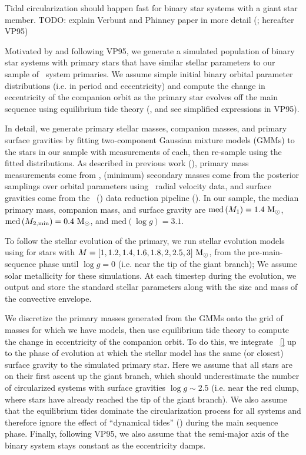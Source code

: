 \documentclass[modern, letterpaper]{aastex62}
\newcommand{\apogee}{\project{\acronym{APOGEE}}}
\newcommand{\DR}{\acronym{DR14}}
\newcommand{\logg}{\ensuremath{\log g}}
\newcommand{\med}[1]{\ensuremath{\textrm{med}\left(#1\right)}}
\begin{document}
Tidal circularization should happen fast for binary star systems with a giant
star member.
TODO: explain Verbunt and Phinney paper in more detail (\citealt{Verbunt:1995}; hereafter VP95)

Motivated by and following VP95, we generate a simulated population of binary
star systems with primary stars that have similar stellar parameters to our
sample of \apogee\ system primaries.
We assume simple initial binary orbital parameter distributions (i.e. in period
and eccentricity) and compute the change in eccentricity of the companion orbit
as the primary star evolves off the main sequence using equilibrium tide theory
(\citealt{Zahn:1966}, and see simplified expressions in VP95).

In detail, we generate primary stellar masses, companion masses, and primary
surface gravities by fitting two-component Gaussian mixture models (GMMs) to the
stars in our sample with measurements of each, then re-sample using the fitted
distributions.
As described in previous work (\citealt{Price-Whelan:2018}), primary mass
measurements come from \cite{Ness:2015}, (minimum) secondary masses come from
the posterior samplings over orbital parameters using \apogee\ radial velocity
data, and surface gravities come from the \apogee\ (\DR) data reduction pipeline
(\citealt{Garcia-Perez:2016}).
In our sample, the median primary mass, companion mass, and surface gravity are
$\med{M_1} = 1.4~\msun$, $\med{M_{2, \textrm{min}}} = 0.4~\msun$, and
$\med{\logg} = 3.1$.

To follow the stellar evolution of the primary, we run stellar evolution models
using  \citealt{Paxton:2011} for stars with $M = [1, 1.2, 1.4,
1.6, 1.8, 2, 2.5, 3]~\mathrm{M}_\odot$, from the pre-main-sequence phase until $\logg = 0$
(i.e. near the tip of the giant branch); We assume solar metallicity for these
simulations.
At each timestep during the evolution, we output and store the standard stellar
parameters along with the size and mass of the convective envelope.

We discretize the primary masses generated from the GMMs onto the grid of masses
for which we have  models, then use equilibrium tide theory to
compute the change in eccentricity of the companion orbit.
To do this, we integrate \equationname~\ref{} up to the phase of evolution at
which the stellar model has the same (or closest) surface gravity to the
simulated primary star.
Here we assume that all stars are on their first ascent up the giant branch,
which should underestimate the number of circularized systems with surface
gravities $\logg \sim 2.5$ (i.e. near the red clump, where stars have already
reached the tip of the giant branch).
We also assume that the equilibrium tides dominate the circularization process
for all systems and therefore ignore the effect of ``dynamical tides''
(\citealt{who}) during the main sequence phase.
Finally, following VP95, we also assume that the semi-major axis of the binary
system stays constant as the eccentricity damps.
\end{document}
